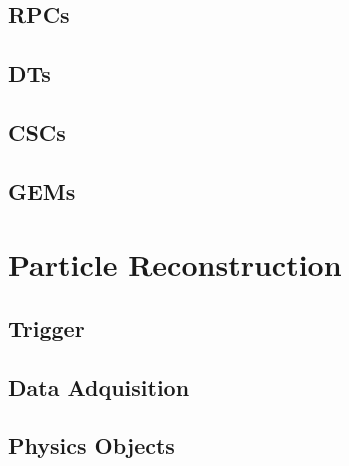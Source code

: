 \subsection{RPCs}
\label{subsec:RPCs}

\subsection{DTs}
\label{subsec:DTs}

\subsection{CSCs}
\label{subsec:CSCs}

\subsection{GEMs}
\label{subsec:GEMs}

\section{Particle Reconstruction}
\label{sec:ParticleReconstruction}

\subsection{Trigger}
\label{subsec:Trigger}

\subsection{Data Adquisition}
\label{subsec:DAQ}

\subsection{Physics Objects}
\label{subsec:PhysicsObjects}
